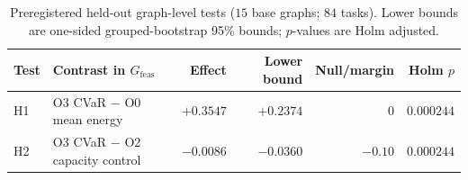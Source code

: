 
\begin{table}[t]
\centering
\caption{Preregistered held-out graph-level tests ($15$ base graphs; $84$ tasks). Lower bounds are one-sided grouped-bootstrap 95\% bounds; $p$-values are Holm adjusted.}
\label{tab:heldout-tests}
\small
\begin{tabularx}{\textwidth}{@{}lXrrrr@{}}
\toprule
Test & Contrast in $G_{\mathrm{feas}}$ & Effect & Lower bound & Null/margin & Holm $p$ \\
\midrule
H1 & O3 CVaR $-$ O0 mean energy & $+0.3547$ & $+0.2374$ & $0$ & $0.000244$ \\
H2 & O3 CVaR $-$ O2 capacity control & $-0.0086$ & $-0.0360$ & $-0.10$ & $0.000244$ \\
\bottomrule
\end{tabularx}
\end{table}
